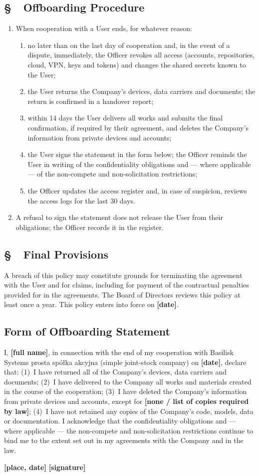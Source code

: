 \documentclass[11pt,a4paper]{report}
\newcounter{paragraf}
\newcommand{\paragraf}[1]{%
  \refstepcounter{paragraf}%
  \Needspace{5\baselineskip}%
  \subsection*{\S~\theparagraf\ #1}%
}
\newenvironment{ContractClause}[1]{\paragraf{#1}}{\par}
\newcommand{\field}[1]{\textbf{[#1]}}
\newcommand{\CompanyFull}{Basilisk Systems prosta spółka akcyjna (simple joint-stock company)}
\begin{document}
\begin{ContractClause}{Offboarding Procedure}
\begin{enumerate}
  \item When cooperation with a User ends, for whatever reason:
  \begin{enumerate}[label=\alph*)]
    \item no later than on the last day of cooperation and, in the event of a dispute, immediately, the Officer revokes all access (accounts, repositories, cloud, VPN, keys and tokens) and changes the shared secrets known to the User;
    \item the User returns the Company's devices, data carriers and documents; the return is confirmed in a handover report;
    \item within 14 days the User delivers all works and submits the final confirmation, if required by their agreement, and deletes the Company's information from private devices and accounts;
    \item the User signs the statement in the form below; the Officer reminds the User in writing of the confidentiality obligations and --- where applicable --- of the non-compete and non-solicitation restrictions;
    \item the Officer updates the access register and, in case of suspicion, reviews the access logs for the last 30 days.
  \end{enumerate}
  \item A refusal to sign the statement does not release the User from their obligations; the Officer records it in the register.
\end{enumerate}
\end{ContractClause}

\begin{ContractClause}{Final Provisions}
A breach of this policy may constitute grounds for terminating the agreement with the User and for claims, including for payment of the contractual penalties provided for in the agreements. The Board of Directors reviews this policy at least once a year. This policy enters into force on \field{date}.
\end{ContractClause}

\subsection*{Form of Offboarding Statement}

I, \field{full name}, in connection with the end of my cooperation with \CompanyFull{} on \field{date}, declare that: (1)~I have returned all of the Company's devices, data carriers and documents; (2)~I have delivered to the Company all works and materials created in the course of the cooperation; (3)~I have deleted the Company's information from private devices and accounts, except for \field{none / list of copies required by law}; (4)~I have not retained any copies of the Company's code, models, data or documentation. I acknowledge that the confidentiality obligations and --- where applicable --- the non-compete and non-solicitation restrictions continue to bind me to the extent set out in my agreements with the Company and in the law.

\field{place, date} \hfill \field{signature}
\end{document}
